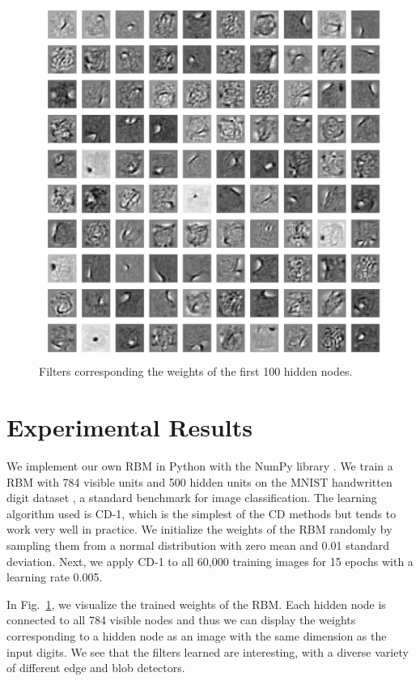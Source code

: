 \documentclass[journal]{IEEEtran}
\begin{document}
\begin{figure}[h]
  \centering
  \includegraphics[width=0.9\linewidth]{filters.png}
  \caption{Filters corresponding the weights of the first 100 hidden nodes.}
  \label{filters}
\end{figure}

\section{Experimental Results}
We implement our own RBM in Python with the NumPy library \cite{oliphant2006guide}. We train a RBM with 784 visible units and 500 hidden units on the MNIST handwritten digit dataset \cite{deng2012mnist}, a standard benchmark for image classification. The learning algorithm used is CD-1, which is the simplest of the CD methods but tends to work very well in practice. We initialize the weights of the RBM randomly by sampling them from a normal distribution with zero mean and 0.01 standard deviation. Next, we apply CD-1 to all 60,000 training images for 15 epochs with a learning rate 0.005.

In Fig.~\ref{filters}, we visualize the trained weights of the RBM. Each hidden node is connected to all 784 visible nodes and thus we can display the weights corresponding to a hidden node as an image with the same dimension as the input digits. We see that the filters learned are interesting, with a diverse variety of different edge and blob detectors. 
\end{document}
